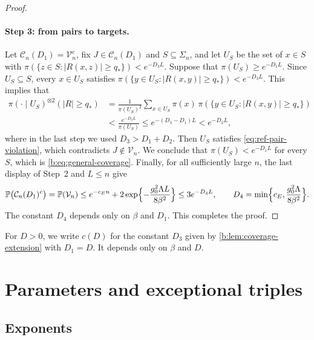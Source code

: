 \begin{proof}
\paragraph{Step 3: from pairs to targets.}
Let $\mathcal C_n(D_1)=\mathcal V_n^c$, fix $J\in\mathcal C_n(D_1)$ and
$S\subseteq\Sigma_n$, and let $U_S$ be the set of $x\in S$ with
$\pi(\{z\in S:|R(x,z)|\ge q_*\})<e^{-D_3L}$. Suppose that
$\pi(U_S)\ge e^{-D_1L}$. Since $U_S\subseteq S$, every $x\in U_S$
satisfies $\pi(\{y\in U_S:|R(x,y)|\ge q_*\})<e^{-D_3L}$. This implies that
\begin{align*}
 \pi(\cdot\mid U_S)^{\otimes2}(|R|\ge q_*)
 &=\frac1{\pi(U_S)^2}\sum_{x\in U_S}\pi(x)\,
   \pi(\{y\in U_S:|R(x,y)|\ge q_*\})\\
 &<\frac{e^{-D_3L}}{\pi(U_S)}
 \le e^{-(D_3-D_1)L}<e^{-D_2L},
\end{align*}
where in the last step we used $D_3>D_1+D_2$. Then $U_S$ satisfies
\eqref{eq:ref-pair-violation}, which contradicts $J\notin\mathcal V_n$.
We conclude that $\pi(U_S)<e^{-D_1L}$ for every $S$, which is
\eqref{b:eq:general-coverage}. Finally, for all sufficiently large $n$, the
last display of Step~2 and $L\le n$ give
\[
 \mathbb P\bigl(\mathcal C_n(D_1)^c\bigr)=\mathbb P(\mathcal V_n)
 \le e^{-c_En}+2\exp\Bigl\{-\frac{g_0^2\Lambda L}{8\beta^2}\Bigr\}
 \le3e^{-D_4L},\qquad
 D_4=\min\Bigl\{c_E,\frac{g_0^2\Lambda}{8\beta^2}\Bigr\}.
\]
The constant $D_4$ depends only on $\beta$ and $D_1$. This completes the
proof.
\end{proof}

For $D>0$, we write $c(D)$ for the constant $D_3$ given by
\cref{b:lem:coverage-extension} with $D_1=D$. It depends only on $\beta$ and
$D$.

\section{Parameters and exceptional triples}\label{sec:ref-parameters}

\subsection{Exponents}


